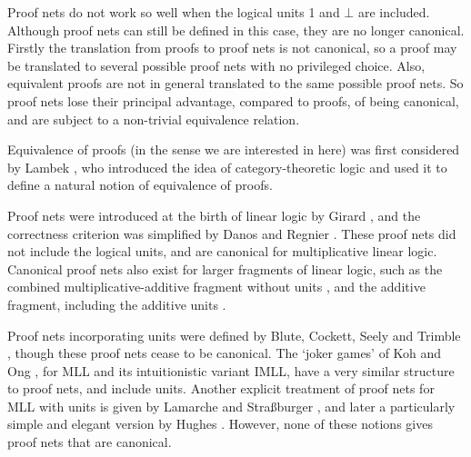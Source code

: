 \documentclass{lmcs}
\let\capsabbrev=\uppercase
\begin{document}
Proof nets do not work so well when the logical units 1 and $\bot$ are included. Although
proof nets can still be defined in this case, they are no longer canonical. Firstly the
translation from proofs to proof nets is not canonical, so a proof may be translated
to several possible proof nets with no privileged choice. Also, equivalent proofs are not
in general translated to the same possible proof nets. So proof nets lose their principal
advantage, compared to proofs, of being canonical, and are subject to a non-trivial
equivalence relation.

Equivalence of proofs (in the sense we are interested in here) was first considered
by Lambek \cite{Lambek-1968}, who introduced the idea of category-theoretic logic and used
it to define a natural notion of equivalence of proofs.

Proof nets were introduced at the birth of linear logic by Girard \cite{Girard-1987}, and
the correctness criterion was simplified by Danos and Regnier \cite{Danos-Regnier-1989}.
These proof nets did not include the logical units, and are canonical for multiplicative linear logic.
%
Canonical proof nets also exist for larger fragments of linear logic, such as the combined multiplicative-additive fragment without units \cite{Hughes-vanGlabbeek-2005}, and the additive fragment, including the additive units \cite{Heijltjes-2011}.

Proof nets incorporating units were defined by Blute, Cockett, Seely and Trimble \cite{Trimble-1994,Blute-Cockett-Seely-Trimble-1996}, though these proof nets cease to be canonical. The `joker games' of Koh and Ong \cite{Koh-Ong-1999}, for \capsabbrev{mll} and its intuitionistic variant \capsabbrev{imll}, have a very similar structure to proof nets, and include units. Another explicit treatment of proof nets for \capsabbrev{mll} with units is given by Lamarche and Stra\ss burger \cite{Lamarche-Strassburger-2006}, and later a particularly simple and elegant version by Hughes \cite{Hughes-2012-categories,Hughes-2012-nets}. However, none of these notions gives proof nets that are canonical.

\end{document}
